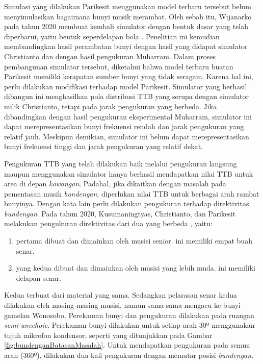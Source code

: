 Simulasi yang dilakukan Parikesit menggunakan model \kowangan terbaru tersebut belum menyimulasikan bagaimana bunyi musik \bundengan merambat. Oleh sebab itu, Wijanarko pada tahun 2020 membuat kembali simulator dengan bentuk dasar yang telah diperbarui, yaitu bentuk seperdelapan bola \cite{skripsiZidan}. Penelitian ini kemudian membandingkan hasil perambatan bunyi dengan hasil yang didapat simulator Christianto dan dengan hasil pengukuran Muharram. Dalam proses pembangunan simulator tersebut, diketahui bahwa model terbaru buatan Parikesit memiliki kerapatan sumber bunyi yang tidak seragam. Karena hal ini, perlu dilakukan modifikasi terhadap model \kowangan Parikesit. Simulator yang berhasil dibangun ini menghasilkan pola distribusi TTB yang serupa dengan simulator milik Christianto, tetapi pada jarak pengukuran yang berbeda. Jika dibandingkan dengan hasil pengukuran eksperimental Muharram, simulator ini dapat merepresentasikan bunyi frekuensi rendah dan jarak pengukuran yang relatif jauh. Meskipun demikian, simulator ini belum dapat merepresentasikan bunyi frekuensi tinggi dan jarak pengukuran yang relatif dekat. \par 
Pengukuran TTB yang telah dilakukan baik melalui pengukuran langsung maupun menggunakan simulator hanya berhasil mendapatkan nilai TTB untuk area di depan \textit{kowangan}. Padahal, jika dikaitkan dengan masalah pada pementasan musik \textit{bundengan}, diperlukan nilai TTB untuk berbagai arah rambat bunyinya. Dengan kata lain perlu dilakukan pengukuran terhadap direktivitas \textit{bundengan}. Pada tahun 2020, Kusumaningtyas, Christianto, dan Parikesit melakukan pengukuran direktivitas dari dua \bundengan yang berbeda \cite{prosidingDirektivitas}, yaitu:
\begin{enumerate}
    \item \Bundengan pertama dibuat dan dimainkan oleh musisi senior. \Bundengan ini memiliki empat buah senar.
    \item \Bundengan yang kedua dibuat dan dimainkan oleh musisi yang lebih muda. \Bundengan ini memiliki delapan senar.
\end{enumerate}
Kedua \bundengan terbuat dari material yang sama. Sedangkan pelarasan senar kedua \bundengan dilakukan oleh masing-masing musisi, namun sama-sama mengacu ke bunyi gamelan Wonosobo. Perekaman bunyi dan pengukuran dilakukan pada ruangan \textit{semi-anechoic}. Perekaman bunyi dilakukan untuk setiap arah 30º menggunakan tujuh mikrofon kondensor, seperti yang ditunjukkan pada Gambar \ref{fig:bundenganBatasanMasalah}. Untuk mendapatkan pengukuran pada semua arah (360º), dilakukan dua kali pengukuran dengan memutar posisi \textit{bundengan}. \par  
